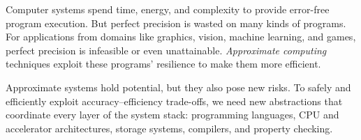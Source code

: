 Computer systems spend time, energy, and complexity to provide error-free
program execution. But
perfect precision is wasted on many kinds of programs. For applications from
domains like graphics, vision, machine learning, and games, perfect precision
is infeasible or even unattainable. \emph{Approximate computing} techniques exploit
these programs' resilience to make them more efficient.

Approximate systems hold potential, but they also pose new
risks.
To safely and efficiently exploit accuracy--efficiency trade-offs, we need
new abstractions that coordinate every layer of the system stack:
programming languages,
CPU and accelerator architectures, storage systems, compilers, and
property checking.

